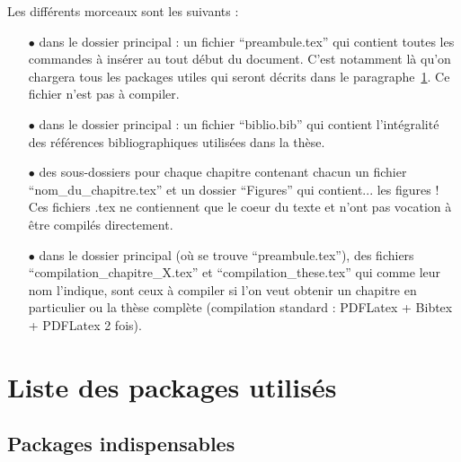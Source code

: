 Les différents morceaux sont les suivants :
\begin{itemize}
\item[$\bullet$] dans le dossier principal : un fichier ``preambule.tex'' qui contient toutes les commandes à insérer au tout début du document. C'est notamment là qu'on chargera tous les packages utiles qui seront décrits dans le paragraphe~\ref{chap1:sec:packages}. Ce fichier n'est pas à compiler.
\item[$\bullet$] dans le dossier principal : un fichier ``biblio.bib'' qui contient l'intégralité des références bibliographiques utilisées dans la thèse.
\item[$\bullet$] des sous-dossiers pour chaque chapitre contenant chacun un fichier ``nom\_du\_chapi\-tre.tex'' et un dossier ``Figures'' qui contient... les figures ! Ces fichiers .tex ne contien\-nent que le coeur du texte et n'ont pas vocation à être compilés directement.
\item[$\bullet$] dans le dossier principal (où se trouve ``preambule.tex''), des fichiers ``compilation\_chapitre\_X.tex'' et ``compilation\_these.tex'' qui comme leur nom l'indique, sont ceux à compiler si l'on veut obtenir un chapitre en particulier ou la thèse complète (compilation standard : PDFLatex + Bibtex + PDFLatex 2 fois).
\end{itemize}

\section{Liste des packages utilisés}
\label{chap1:sec:packages}

\subsection{Packages indispensables}

